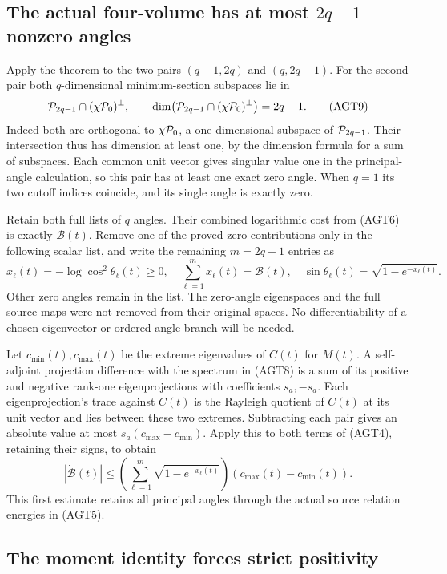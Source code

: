 \subsection{The actual four-volume has at most \texorpdfstring{$2q-1$}{2q-1} nonzero angles}

Apply the theorem to the two pairs $(q-1,2q)$ and $(q,2q-1)$.
For the second pair both $q$-dimensional minimum-section
subspaces lie in
\[
 \mathcal P_{2q-1}\cap(\chi\mathcal P_0)^\perp,
 \qquad\dim\bigl(\mathcal P_{2q-1}\cap(\chi\mathcal P_0)^\perp\bigr)=2q-1.
 \tag{AGT9}
\]
Indeed both are orthogonal to $\chi\mathcal P_0$, a one-dimensional
subspace of $\mathcal P_{2q-1}$. Their intersection thus has dimension
at least one, by the dimension formula for a sum of subspaces.
Each common unit vector gives singular value one in the
principal-angle calculation, so this pair has at least one
exact zero angle. When $q=1$ its two cutoff indices coincide,
and its single angle is exactly zero.

Retain both full lists of $q$ angles. Their combined logarithmic
cost from (AGT6) is exactly $\mathcal B(t)$. Remove one of the
proved zero contributions only in the following scalar list,
and write the remaining $m=2q-1$ entries as
\[
 x_\ell(t)=-\log\cos^2\theta_\ell(t)\ge0,
 \quad\sum_{\ell=1}^{m}x_\ell(t)=\mathcal B(t),
 \quad\sin\theta_\ell(t)=\sqrt{1-e^{-x_\ell(t)}}.
 \tag{AGT10}
\]
Other zero angles remain in the list. The zero-angle eigenspaces
and the full source maps were not removed from their original
spaces. No differentiability of a chosen eigenvector or ordered
angle branch will be needed.

Let $c_{\min}(t),c_{\max}(t)$ be the extreme eigenvalues of
$C(t)$ for $M(t)$. A self-adjoint projection difference with
the spectrum in (AGT8) is a sum of its positive and negative
rank-one eigenprojections with coefficients $s_a,-s_a$.
Each eigenprojection's trace against $C(t)$ is the Rayleigh
quotient of $C(t)$ at its unit vector and lies between these
two extremes. Subtracting each pair gives an absolute value
at most $s_a(c_{\max}-c_{\min})$. Apply this to both terms
of (AGT4), retaining their signs, to obtain
\[
 |\dot{\mathcal B}(t)|
 \le\left(\sum_{\ell=1}^{m}\sqrt{1-e^{-x_\ell(t)}}\right)
                       (c_{\max}(t)-c_{\min}(t)).
 \tag{AGT11}
\]
This first estimate retains all principal angles through the
actual source relation energies in (AGT5).

\subsection{The moment identity forces strict positivity}

